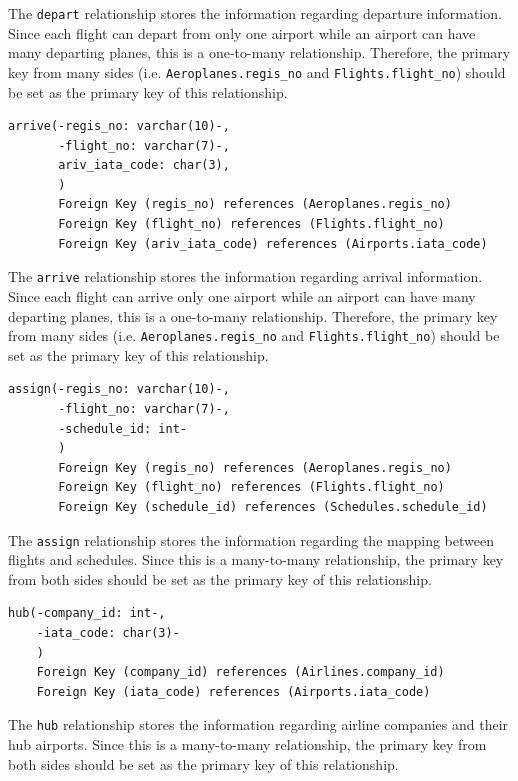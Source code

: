 \documentclass{article}
\begin{document}
	The \texttt{depart} relationship stores the information regarding departure information. Since each flight can depart from only one airport while an airport can have many departing planes, this is a one-to-many relationship. Therefore, the primary key from many sides (i.e. \texttt{Aeroplanes.regis\_no} and \texttt{Flights.flight\_no}) should be set as the primary key of this relationship.

	\begin{lstlisting}[keepspaces=true]
arrive(-regis_no: varchar(10)-,
       -flight_no: varchar(7)-, 
       ariv_iata_code: char(3),
       )  
       Foreign Key (regis_no) references (Aeroplanes.regis_no)
       Foreign Key (flight_no) references (Flights.flight_no)
       Foreign Key (ariv_iata_code) references (Airports.iata_code)
	\end{lstlisting}    

	The \texttt{arrive} relationship stores the information regarding arrival information. Since each flight can arrive only one airport while an airport can have many departing planes, this is a one-to-many relationship. Therefore, the primary key from many sides (i.e. \texttt{Aeroplanes.regis\_no} and \texttt{Flights.flight\_no}) should be set as the primary key of this relationship.

	\begin{lstlisting}[keepspaces=true]		
assign(-regis_no: varchar(10)-,
       -flight_no: varchar(7)-,
       -schedule_id: int-
       )
       Foreign Key (regis_no) references (Aeroplanes.regis_no)
       Foreign Key (flight_no) references (Flights.flight_no)
       Foreign Key (schedule_id) references (Schedules.schedule_id)
	\end{lstlisting}    

	The \texttt{assign} relationship stores the information regarding the mapping between flights and schedules. Since this is a many-to-many relationship, the primary key from both sides should be set as the primary key of this relationship.

	\begin{lstlisting}[keepspaces=true]	
hub(-company_id: int-,
    -iata_code: char(3)-
    )
    Foreign Key (company_id) references (Airlines.company_id)
    Foreign Key (iata_code) references (Airports.iata_code)
	\end{lstlisting}    

	The \texttt{hub} relationship stores the information regarding airline companies and their hub airports. Since this is a many-to-many relationship, the primary key from both sides should be set as the primary key of this relationship.
\end{document}
